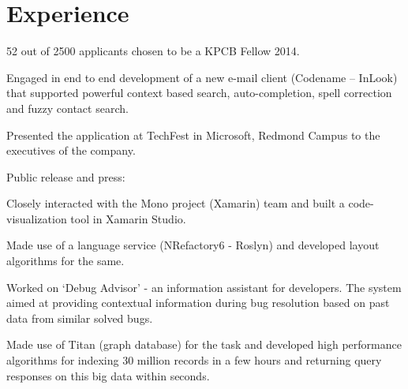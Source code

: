 \documentclass[]{resume-openfont}
\begin{document}
\begin{minipage}[t]{0.69\textwidth} 


\section{Experience}

\vspace{\topsep} %
\begin{tightemize}
\item 52 out of 2500 applicants chosen to be a KPCB Fellow 2014.
\end{tightemize}
\sectionsep

\begin{tightemize}
\item Engaged in end to end development of a new e-mail client (Codename – InLook) that supported powerful context based search, auto-completion, spell correction and fuzzy contact search. 
\item Presented the application at TechFest in Microsoft, Redmond Campus to the executives of the company.
\item Public release and press: 
\end{tightemize}
\sectionsep

\begin{tightemize}
\item Closely interacted with the Mono project (Xamarin) team and built a code-visualization tool in Xamarin Studio.
\item Made use of a language service (NRefactory6 - Roslyn) and developed layout algorithms for the same.
\end{tightemize}
\sectionsep

\begin{tightemize}
\item Worked on ‘Debug Advisor’ - an information assistant for developers. The system aimed at providing contextual information during bug resolution based on past data from similar solved bugs. 
\item Made use of Titan (graph database) for the task and developed high performance algorithms for indexing 30 million records in a few hours and returning query responses on this big data within seconds.
\end{tightemize}
\sectionsep


\end{minipage}
\end{document}
